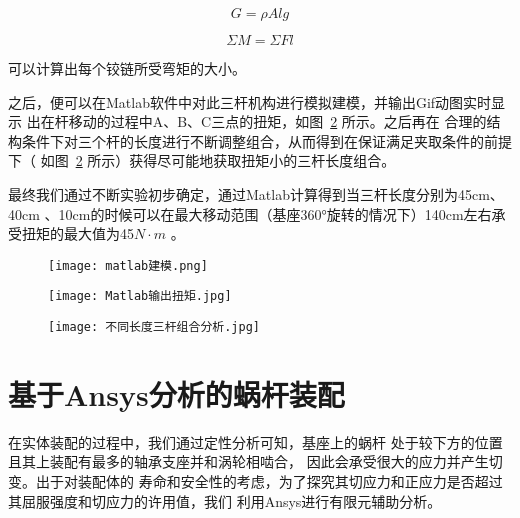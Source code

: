   \begin{equation}
    G= \rho Alg
  \end{equation}

  \begin{equation}
    \Sigma M=\Sigma Fl
  \end{equation}
  
  {\songti 可以计算出每个铰链所受弯矩的大小。}



  {\songti 之后，便可以在Matlab软件中对此三杆机构进行模拟建模，并输出Gif动图实时显示
  出在杆移动的过程中A、B、C三点的扭矩，如图~\ref{fig:Matlab输出扭矩} 所示。之后再在
  合理的结构条件下对三个杆的长度进行不断调整组合，从而得到在保证满足夹取条件的前提下（
  如图~\ref{fig:Matlab输出扭矩} 所示）获得尽可能地获取扭矩小的三杆长度组合。}

  {\songti 最终我们通过不断实验初步确定，通过Matlab计算得到当三杆长度分别为45cm、40cm
  、10cm的时候可以在最大移动范围（基座360°旋转的情况下）140cm左右承受扭矩的最大值为45$N\cdot{m}$ 。

  \begin{figure}[!htp]
    \centering
    \texttt{[image: matlab建模.png]}
    \label{fig:matlab建模}
  \end{figure}

  \begin{figure}[!htp]
    \centering
    \texttt{[image: Matlab输出扭矩.jpg]}
    \label{fig:Matlab输出扭矩}
  \end{figure}

  \begin{figure}[!htp]
    \centering
    \texttt{[image: 不同长度三杆组合分析.jpg]}
    \label{fig:不同长度三杆组合分析}
  \end{figure}


\section{基于Ansys分析的蜗杆装配}

  {\songti 在实体装配的过程中，我们通过定性分析可知，基座上的蜗杆
  处于较下方的位置且其上装配有最多的轴承支座并和涡轮相啮合，
  因此会承受很大的应力并产生切变。出于对装配体的
  寿命和安全性的考虑，为了探究其切应力和正应力是否超过其屈服强度和切应力的许用值，我们
  利用Ansys进行有限元辅助分析。}
  
}
